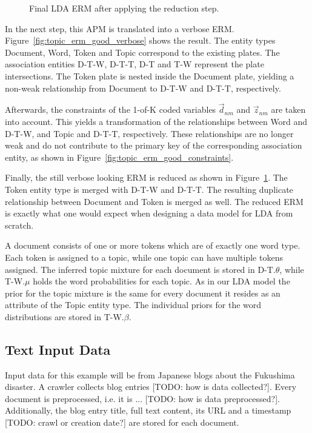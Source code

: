 \begin{figure}[p]
\centering
\scalebox{0.5}{\adjustTikzSize }
\caption[Final LDA ERM after applying the reduction step]{Final LDA ERM after applying the reduction step.}\label{fig:topic_erm_good_reduced}
\end{figure}

In the next step, this APM is translated into a verbose ERM. Figure~\ref{fig:topic_erm_good_verbose} shows the result. The entity types Document, Word, Token and Topic correspond to the existing plates. The association entities D-T-W, D-T-T, D-T and T-W represent the plate intersections. The Token plate is nested inside the Document plate, yielding a non-weak relationship from Document to D-T-W and D-T-T, respectively.

Afterwards, the constraints of the 1-of-K coded variables $\vec d_{nm}$ and $\vec z_{nm}$ are taken into account. This yields a transformation of the relationships between Word and D-T-W, and Topic and D-T-T, respectively. These relationships are no longer weak and do not contribute to the primary key of the corresponding association entity, as shown in Figure~\ref{fig:topic_erm_good_constraints}.

Finally, the still verbose looking ERM is reduced as shown in Figure~\ref{fig:topic_erm_good_reduced}. The Token entity type is merged with D-T-W and D-T-T. The resulting duplicate relationship between Document and Token is merged as well. The reduced ERM is exactly what one would expect when designing a data model for LDA from scratch.

A document consists of one or more tokens which are of exactly one word type. Each token is assigned to a topic, while one topic can have multiple tokens assigned. The inferred topic mixture for each document is stored in D-T.$\theta$, while T-W.$\mu$ holds the word probabilities for each topic. As in our LDA model the prior for the topic mixture is the same for every document it resides as an attribute of the Topic entity type. The individual priors for the word distributions are stored in T-W.$\beta$.

\subsection{Text Input Data}

Input data for this example will be from Japanese blogs about the Fukushima disaster. A crawler collects blog entries [TODO: how is data collected?]. Every document is preprocessed, i.e. it is ... [TODO: how is data preprocessed?]. Additionally, the blog entry title, full text content, its URL and a timestamp [TODO: crawl or creation date?] are stored for each document. 


